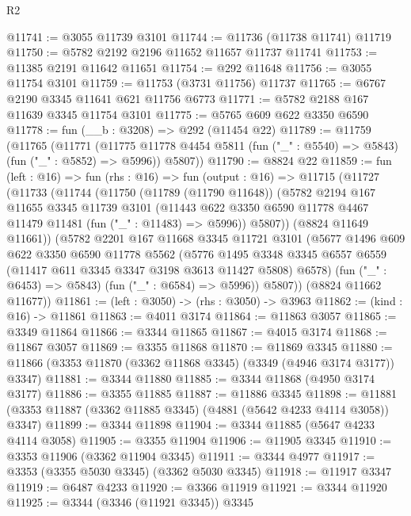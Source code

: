 \begin{lexlean}{R2}
\begin{coremodule}
@11741 := @3055 @11739 @3101
@11744 := @11736 (@11738 @11741) @11719
@11750 := @5782 @2192 @2196 @11652 @11657 @11737 @11741
@11753 := @11385 @2191 @11642 @11651
@11754 := @292 @11648
@11756 := @3055 @11754 @3101
@11759 := @11753 (@3731 @11756) @11737
@11765 := @6767 @2190 @3345 @11641 @621 @11756 @6773
@11771 := @5782 @2188 @167 @11639 @3345 @11754 @3101
@11775 := @5765 @609 @622 @3350 @6590
@11778 := fun (__b : @3208) => @292 (@11454 @22)
@11789 := @11759
    (@11765
      (@11771
        (@11775 @11778 @4454 @5811 (fun ("_" : @5540) => @5843) (fun ("_" : @5852) => @5996))
        @5807))
@11790 := @8824 @22
@11859 := fun (left : @16) =>
  fun (rhs : @16) =>
  fun (output : @16) =>
  @11715
    (@11727
      (@11733
        (@11744
          (@11750
            (@11789 (@11790 @11648))
            (@5782
              @2194
              @167
              @11655
              @3345
              @11739
              @3101
              (@11443 @622 @3350 @6590 @11778 @4467 @11479 @11481 (fun ("_" : @11483) => @5996))
              @5807))
          (@8824 @11649 @11661))
        (@5782
          @2201
          @167
          @11668
          @3345
          @11721
          @3101
          (@5677
            @1496
            @609
            @622
            @3350
            @6590
            @11778
            @5562
            (@5776
              @1495
              @3348
              @3345
              @6557
              @6559
              (@11417 @611 @3345 @3347 @3198 @3613 @11427 @5808)
              @6578)
            (fun ("_" : @6453) => @5843)
            (fun ("_" : @6584) => @5996))
          @5807))
      (@8824 @11662 @11677))
@11861 := (left : @3050) -> (rhs : @3050) -> @3963
@11862 := (kind : @16) -> @11861
@11863 := @4011 @3174
@11864 := @11863 @3057
@11865 := @3349 @11864
@11866 := @3344 @11865
@11867 := @4015 @3174
@11868 := @11867 @3057
@11869 := @3355 @11868
@11870 := @11869 @3345
@11880 := @11866 (@3353 @11870 (@3362 @11868 @3345) (@3349 (@4946 @3174 @3177)) @3347)
@11881 := @3344 @11880
@11885 := @3344 @11868 (@4950 @3174 @3177)
@11886 := @3355 @11885
@11887 := @11886 @3345
@11898 := @11881 (@3353 @11887 (@3362 @11885 @3345) (@4881 (@5642 @4233 @4114 @3058)) @3347)
@11899 := @3344 @11898
@11904 := @3344 @11885 (@5647 @4233 @4114 @3058)
@11905 := @3355 @11904
@11906 := @11905 @3345
@11910 := @3353 @11906 (@3362 @11904 @3345)
@11911 := @3344 @4977
@11917 := @3353 (@3355 @5030 @3345) (@3362 @5030 @3345)
@11918 := @11917 @3347
@11919 := @6487 @4233
@11920 := @3366 @11919
@11921 := @3344 @11920
@11925 := @3344 (@3346 (@11921 @3345)) @3345

\end{coremodule}
\end{lexlean}
